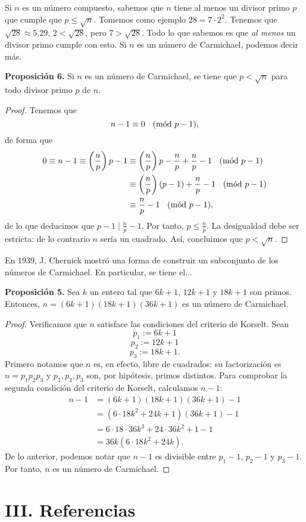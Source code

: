 \documentclass{article}
\theoremstyle{definition}
\newcommand{\Mod}[1]{\ \hspace{0.2cm} (\mathrm{m\acute{o}d}\ #1)}
\begin{document}
Si $n$ es un número compuesto, sabemos que $n$ tiene al menos un divisor primo $p$ que cumple que $ p \leq \sqrt{n}$.  Tomemos como ejemplo $28 = 7 \cdot 2^2$. Tenemos que $\sqrt{28} \approx 5.29$, $2 < \sqrt{28}$, pero $7 > \sqrt{28}$. Todo lo que sabemos es que \textit{al menos} un divisor primo cumple con esto. Si $n$ es un número de Carmichael, podemos decir más. 
\begin{mybox2}
	\textbf{Proposición 6. } Si $n$ es un número de Carmichael, se tiene que $p < \sqrt{n}$ para todo divisor primo $p$ de $n$. 
\end{mybox2}	
\begin{proof}
	Tenemos que  
	$$ n - 1 \equiv 0 \Mod{p -1}, $$
	de forma que 
\begin{equation*}
\begin{split}
0\equiv n - 1 \equiv \left( \frac{n}{p} \right)p - 1& \equiv \left( \frac{n}{p}\right)p - \frac{n}{p} + \frac{n}{p}  - 1 \Mod{p - 1} \\
& \equiv \left( \frac{n}{p} \right) (p - 1) + \frac{n}{p} - 1 \Mod{p - 1} \\
&\equiv \frac{n}{p} - 1 \Mod{p - 1},   
\end{split}
\end{equation*}	
de lo que deducimos que $p - 1 \mid \frac{n}{p} - 1$. Por tanto, $ p \leq \frac{n}{p}$. La desigualdad debe ser estricta: de lo contrario $n$ sería un cuadrado. Así, concluimos que $p < \sqrt{n}$.
\end{proof}

En $1939$, J. Chernick mostró una forma de construir un subconjunto de los números de Carmichael. En particular, se tiene el...
\begin{mybox2}
\textbf{Proposición 5. } Sea $k$ un entero tal que $6k + 1$, $12k + 1$ y $18k + 1$ son primos. Entonces, 
$n = (6k + 1)(18k+1)(36k + 1)$
es un número de Carmichael. 
\end{mybox2}		
\begin{proof}
	Verificamos que $n$ satisface las condiciones del criterio de Korselt. Sean 
	$$ p_{1} := 6k + 1 $$
	$$ p_{2} := 12k + 1 $$
	$$ p_{3} := 18k + 1 .$$
	Primero notamos que $n$ es, en efecto, libre de cuadrados: su factorización es $n = p_{1} p_{2} p_{3}$ y $p_{1}, p_{2}, p_{3}$ son, por hipótesis, primos distintos. Para comprobar la segunda condición del criterio de Korselt, calculamos $n - 1$:
\begin{equation*}
\begin{split}
n - 1 &= (6k + 1)(18k + 1)(36k + 1) - 1 \\
&= (6 \cdot 18 k^2 + 24k + 1)(36k + 1) - 1 \\
&= 6\cdot 18 \cdot 36 k^3 + 24 \cdot 36 k^2 + 1 - 1 \\
& = 36k(6 \cdot 18 k^2 +  24k).
\end{split}
\end{equation*}
De lo anterior, podemos notar que $n - 1$ es divisible entre $p_{1} - 1$, $p_{2} - 1$ y $p_{3} - 1$. Por tanto, $n$ es un número de Carmichael. 
\end{proof}
\section*{ III. Referencias}
\end{document}
